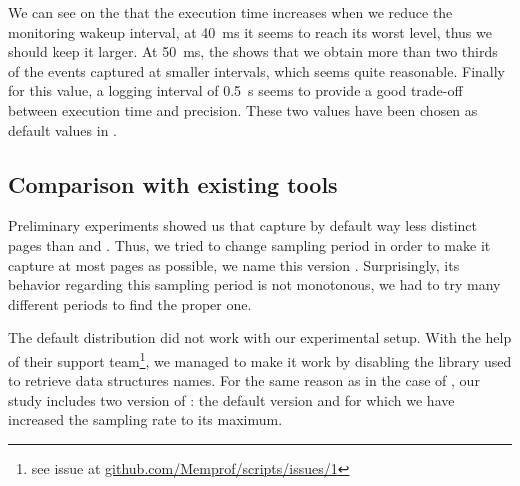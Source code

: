 We can see on the  that the execution time increases when we
reduce the monitoring wakeup interval, at \SI{40}{ms}
it seems to reach its worst level, thus we should keep it larger. At \SI{50}{ms}, the
 shows that we obtain more than two thirds of the events captured
at smaller intervals, which seems quite reasonable. Finally for this value, a logging
interval of \SI{0.5}{s} seems to provide a good trade-off  between
execution time and precision.
These two values have been chosen as default values in \Moca.



\subsection{Comparison with existing tools}
\label{sec:expe-ovh}

Preliminary experiments showed us that \Mitos capture by
default way less distinct pages than \TABARNAC and \Moca. Thus, we tried to change \Mitos
sampling period in order to make it capture at most pages as possible, 
we name this version \MitosTun. Surprisingly, its behavior regarding this sampling period
is not monotonous, we had to try many different periods to find the proper one.

The default \MemProf distribution did not work with our experimental setup. With the help
of their support team\footnote{see issue at
    \href{https://github.com/Memprof/scripts/issues/1}{github.com/Memprof/scripts/issues/1}}, we managed to make it work by disabling the library used to retrieve
data structures names. For the same reason as in the case of \Mitos, our study includes
two version of \MemProf: the default version and \MemProfTun for which we have
increased the sampling rate to its maximum.

